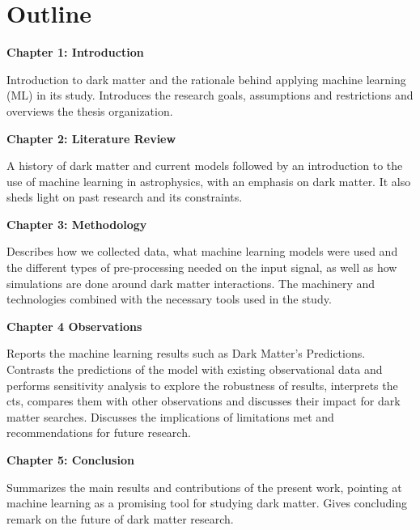  

\section{Outline}


\textbf{Chapter 1: Introduction}

Introduction to dark matter and the rationale behind applying machine learning (ML) in its study. Introduces the research goals, assumptions and restrictions and overviews the thesis organization.

\textbf{Chapter 2: Literature Review}

A history of dark matter and current models followed by an introduction to the use of machine learning in astrophysics, with an emphasis on dark matter. It also sheds light on past research and its constraints.

\textbf{Chapter 3: Methodology}

Describes how we collected data, what machine learning models were used and the different types of pre-processing needed on the input signal, as well as how simulations are done around dark matter interactions. The machinery and technologies combined with the necessary tools used in the study.

\textbf{Chapter 4 Observations}

Reports the machine learning results such as Dark Matter's Predictions. Contrasts the predictions of the model with existing observational data and performs sensitivity analysis to explore the robustness of results, interprets the cts, compares them with other observations and discusses their impact for dark matter searches. Discusses the implications of limitations met and recommendations for future research.

\textbf{Chapter 5: Conclusion}

Summarizes the main results and contributions of the present work, pointing at machine learning as a promising tool for studying dark matter. Gives concluding remark on the future of dark matter research.

 

 
  





